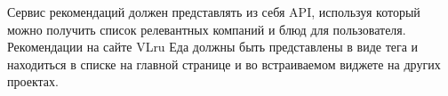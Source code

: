 Сервис рекомендаций должен представлять из себя API, используя который можно получить
список релевантных компаний и блюд для пользователя.
Рекомендации на сайте VLru Еда должны быть представлены в виде тега и находиться в
списке на главной странице и во встраиваемом виджете на других проектах.
